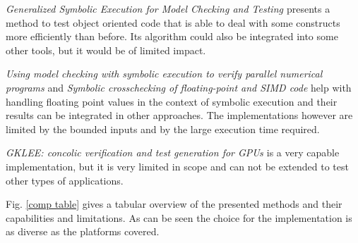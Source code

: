 \documentclass[10pt]{llncs}
\begin{document}
\emph{Generalized Symbolic Execution for Model Checking and Testing \cite{base5}} presents a method to test object oriented code that is able to deal with some constructs more efficiently than before. Its algorithm could also be integrated into some other tools, but it would be of limited impact.

\emph{Using model checking with symbolic execution to verify parallel numerical programs} \cite{base1} and \emph{Symbolic crosschecking of floating-point and SIMD code} \cite{base6} help with handling floating point values in the context of symbolic execution and their results can be integrated in other approaches. The implementations however are limited by the bounded inputs and by the large execution time required.

\emph{GKLEE: concolic verification and test generation for GPUs \cite{base7}} is a very capable implementation, but it is very limited in scope and can not be extended to test other types of applications.

Fig. \ref{comp table} gives a tabular overview of the presented methods and their capabilities and limitations. As can be seen the choice for the implementation is as diverse as the platforms covered.
\end{document}
